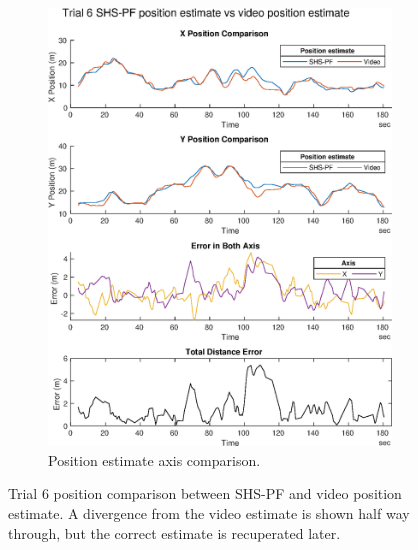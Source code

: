 \begin{figure}[H]
\begin{subfigure}[t]{.45\textwidth}
 		\includegraphics[width=\linewidth]{images/20201129_1858_trial_6_traj_1}
 		\caption{Position estimate axis comparison.}
 		\label{fig:shspf_trial6_comparison}
 	\end{subfigure}
 \setlength{\belowcaptionskip}{-20pt}
 	\caption{Trial 6 position comparison between SHS-PF and video position estimate. A divergence from the video estimate is shown half way through, but the correct estimate is recuperated later.  }
 	\label{fig:shspf_trial6_shs_gt_comparison}
 \end{figure}

